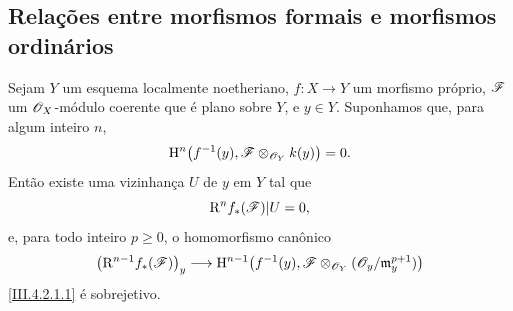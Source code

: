 \subsection{Relações entre morfismos formais e morfismos ordinários}
\label{subsection:III.4.6}

\begin{proposition}[4.6.1]
\label{III.4.6.1}
Sejam $Y$ um esquema localmente noetheriano, $f:X\to Y$ um
morfismo próprio, $\mathscr{F}$ um $\mathscr{O}_X$-módulo coerente que é
plano sobre $Y$, e $y\in Y$. Suponhamos que, para algum inteiro
$n$,
\[
  \mathrm{H}^n\bigl(f^{-1}(y),
    \mathscr{F}\otimes_{\mathscr{O}_Y}k(y)\bigr)=0.
\]
Então existe uma vizinhança $U$ de $y$ em $Y$ tal que
\[
  \mathrm{R}^n f_*(\mathscr{F})|U=0,
\]
e, para todo inteiro $p\geq0$, o homomorfismo canônico
\[
  \bigl(\mathrm{R}^{n-1}f_*(\mathscr{F})\bigr)_y
  \longrightarrow
  \mathrm{H}^{n-1}\bigl(f^{-1}(y),
    \mathscr{F}\otimes_{\mathscr{O}_Y}
      (\mathscr{O}_y/\mathfrak m_y^{p+1})\bigr)
\]
\eqref{III.4.2.1.1} é sobrejetivo.
\end{proposition}

